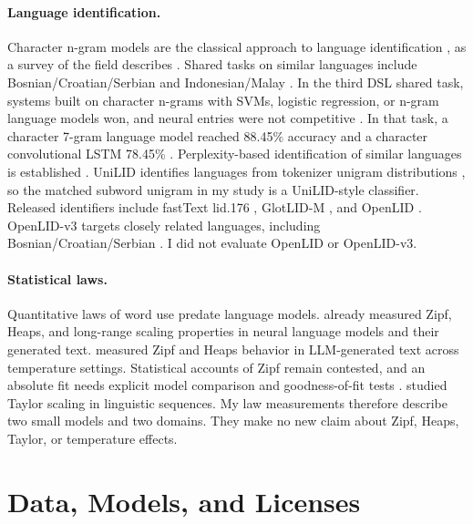 \documentclass[11pt]{article}
\begin{document}
\paragraph{Language identification.} Character n-gram models are the classical
approach to language identification \citep{cavnar1994ngram,dunning1994statistical},
as a survey of the field describes \citep{jauhiainen2019survey}.
Shared tasks on similar languages include Bosnian/Croatian/Serbian and
Indonesian/Malay \citep{zampieri2014dsl}. In the third DSL shared task, systems
built on character n-grams with SVMs, logistic regression, or n-gram language
models won, and neural entries were not competitive \citep{malmasi2016dsl}.
In that task, a character 7-gram language model reached 88.45\% accuracy and a
character convolutional LSTM 78.45\% \citep{cianflone2016ngram}.
Perplexity-based identification of similar languages is established
\citep{gamallo2017perplexity}. UniLID identifies languages from tokenizer
unigram distributions \citep{meister2026unilid}, so the matched subword
unigram in my study is a UniLID-style classifier. Released identifiers include
fastText lid.176 \citep{joulin2017bag,joulin2016fasttextzip}, GlotLID-M
\citep{kargaran2023glotlid}, and OpenLID \citep{burchell2023openlid}.
OpenLID-v3 targets closely related languages, including
Bosnian/Croatian/Serbian \citep{fedorova2026openlidv3}. I did not evaluate
OpenLID or OpenLID-v3.

\paragraph{Statistical laws.} Quantitative laws of word use predate language
models. \citet{takahashi2017neural,takahashi2019scaling} already measured
Zipf, Heaps, and long-range scaling properties in neural language models and
their generated text. \citet{mikhaylovskiy2025zipf} measured Zipf and Heaps
behavior in LLM-generated text across temperature settings. Statistical
accounts of Zipf remain contested, and an absolute fit needs explicit model
comparison and goodness-of-fit tests \citep{piantadosi2014zipf,clauset2009powerlaw}.
\citet{kobayashi2018taylor} studied Taylor scaling in linguistic sequences.
My law measurements therefore describe two small models and two domains. They
make no new claim about Zipf, Heaps, Taylor, or temperature effects.

\section{Data, Models, and Licenses}
\end{document}
